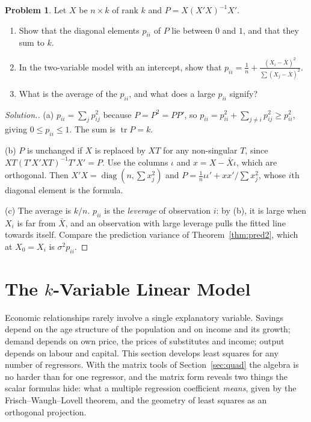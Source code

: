 \documentclass[11pt,a4paper]{article}
\numberwithin{equation}{section}
\DeclareMathOperator{\tr}{tr}
\theoremstyle{definition}
\newtheorem{problemx}{Problem}[subsection]
\newenvironment{problem}{\begin{problemx}}{\end{problemx}}
\newenvironment{solution}
  {\renewcommand{\qedsymbol}{}\begin{proof}[\textit{Solution}.]}
  {\end{proof}}
\begin{document}
\begin{problem}
\label{prob:leverage}
Let $X$ be $n \times k$ of rank $k$ and $P = X(X'X)^{-1}X'$.
\begin{enumerate}[label=(\alph*)]
\item Show that the diagonal elements $p_{ii}$ of $P$ lie between $0$ and $1$, and that they sum to $k$.
\item In the two-variable model with an intercept, show that $p_{ii} = \frac1n + \frac{(X_i - \bar X)^2}{\sum (X_j - \bar X)^2}$.
\item What is the average of the $p_{ii}$, and what does a large $p_{ii}$ signify?
\end{enumerate}
\end{problem}

\begin{solution}
(a) $p_{ii} = \sum_jp_{ij}^2$ because $P = P^2 = PP'$, so $p_{ii} = p_{ii}^2 + \sum_{j\neq i}p_{ij}^2 \geq p_{ii}^2$, giving $0 \leq p_{ii} \leq 1$. The sum is $\tr P = k$.

(b) $P$ is unchanged if $X$ is replaced by $XT$ for any non-singular $T$, since $XT(T'X'XT)^{-1}T'X' = P$. Use the columns $\iota$ and $x = X - \bar X\iota$,
which are orthogonal. Then $X'X = \operatorname{diag}(n, \sum x_j^2)$ and $P = \frac1n\iota\iota' + xx'/\sum x_j^2$, whose $i$th diagonal element is the formula.

(c) The average is $k/n$. $p_{ii}$ is the \emph{leverage} of observation $i$: by (b), it is large when $X_i$ is far from $\bar X$, and an observation with
large leverage pulls the fitted line towards itself. Compare the prediction variance of Theorem~\ref{thm:pred2}, which at $X_0 = X_i$ is $\sigma^2p_{ii}$.
\end{solution}

\section{The $k$-Variable Linear Model}
\label{sec:kvar}

Economic relationships rarely involve a single explanatory variable. Savings depend on the age structure of the population and on income
and its growth; demand depends on own price, the prices of substitutes and income; output depends on labour and capital. This section develops
least squares for any number of regressors. With the matrix tools of Section~\ref{sec:quad} the algebra is no harder than for one regressor, and
the matrix form reveals two things the scalar formulas hide: what a multiple regression coefficient \emph{means}, given by the
Frisch--Waugh--Lovell theorem, and the geometry of least squares as an orthogonal projection.
\end{document}
